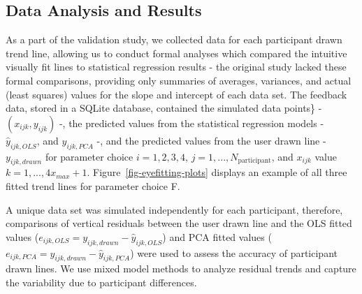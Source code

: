 \documentclass[
]{jds}
\begin{document}
\hypertarget{data-analysis-and-results}{%
\subsection{Data Analysis and Results}\label{data-analysis-and-results}}

As a part of the validation study, we collected data for each
participant drawn trend line, allowing us to conduct formal analyses
which compared the intuitive visually fit lines to statistical
regression results - the original study lacked these formal comparisons,
providing only summaries of averages, variances, and actual (least
squares) values for the slope and intercept of each data set. The
feedback data, stored in a SQLite database, contained the simulated data
points\} - \((x_{ijk}, y_{ijk})\) -, the predicted values from the
statistical regression models - \(\hat y_{ijk,OLS}\), and
\(\hat y_{ijk,PCA}\) -, and the predicted values from the user drawn
line - \(y_{ijk,drawn}\) for parameter choice \(i = 1,2,3,4\),
\(j = 1,...,N_\text{participant}\), and \(x_{ijk}\) value
\(k = 1, ...,4 x_{max} + 1\). Figure~\ref{fig-eyefitting-plots} displays
an example of all three fitted trend lines for parameter choice F.

A unique data set was simulated independently for each participant,
therefore, comparisons of vertical residuals between the user drawn line
and the OLS fitted values
(\(e_{ijk,OLS} = y_{ijk,drawn} - \hat y_{ijk,OLS}\)) and PCA fitted
values (\(e_{ijk,PCA} = y_{ijk,drawn} - \hat y_{ijk,PCA}\)) were used to
assess the accuracy of participant drawn lines. We use mixed model
methods to analyze residual trends and capture the variability due to
participant differences.
\end{document}
